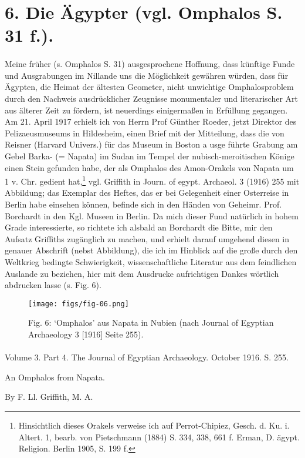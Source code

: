 \documentclass[a4paper, 11pt, oneside]{article}
\begin{document}
\section{6. Die Ägypter (vgl. Omphalos S. 31 f.).}
\paragraph{}
Meine früher (s. Omphalos S. 31) ausgesprochene Hoffnung, dass künftige Funde und Ausgrabungen im Nillande uns die Möglichkeit gewähren würden, dass für Ägypten, die Heimat der ältesten Geometer, nicht unwichtige Omphalosproblem durch den Nachweis ausdrücklicher Zeugnisse monumentaler und literarischer Art aus älterer Zeit zu fördern, ist neuerdings einigermaßen in Erfüllung gegangen. Am 21. April 1917 erhielt ich von Herrn Prof Günther Roeder, jetzt Direktor des Pelizaeusmuseums in Hildesheim, einen Brief mit der Mitteilung, dass die von Reisner (Harvard Univers.) für das Museum in Boston a usge führte Grabung am Gebel Barka- (= Napata) im Sudan im Tempel der nubisch-meroitischen Könige einen Stein gefunden habe, der als Omphalos des Amon-Orakels von Napata um 1 v. Chr. gedient hat,\footnote{Hinsichtlich dieses Orakels verweise ich auf Perrot-Chipiez, Gesch. d. Ku. i. Altert. 1, bearb. von Pietschmann (1884) S. 334, 338, 661 f. Erman, D. ägypt. Religion. Berlin 1905, S. 199 f.} vgl. Griffith in Journ. of egypt. Archaeol. 3 (1916) 255 mit Abbildung; das Exemplar des Heftes, das er bei Gelegenheit einer Osterreise in Berlin habe einsehen können, befinde sich in den Händen von Geheimr. Prof. Borchardt in den Kgl. Museen in Berlin. Da mich dieser Fund natürlich in hohem Grade interessierte, so richtete ich alsbald an Borchardt die Bitte, mir den Aufsatz Griffiths zugänglich zu machen, und erhielt darauf umgehend diesen in genauer Abschrift (nebst Abbildung), die ich im Hinblick auf die große durch den Weltkrieg bedingte Schwierigkeit, wissenschaftliche Literatur aus dem feindlichen Auslande zu beziehen, hier mit dem Ausdrucke aufrichtigen Dankes wörtlich abdrucken lasse (s. Fig. 6).

\begin{figure}[H]
\centering
\texttt{[image: figs/fig-06.png]}
\caption{Fig. 6: `Omphalos' aus Napata in Nubien (nach Journal of Egyptian Archaeology 3 [1916] Seite 255).}
\end{figure}
\paragraph{}
\begin{center}
Volume 3. Part 4. The Journal of Egyptian Archaeology. October 1916. S. 255.

An Omphalos from Napata.

By F. Ll. Griffith, M. A.
\end{center}
\end{document}
